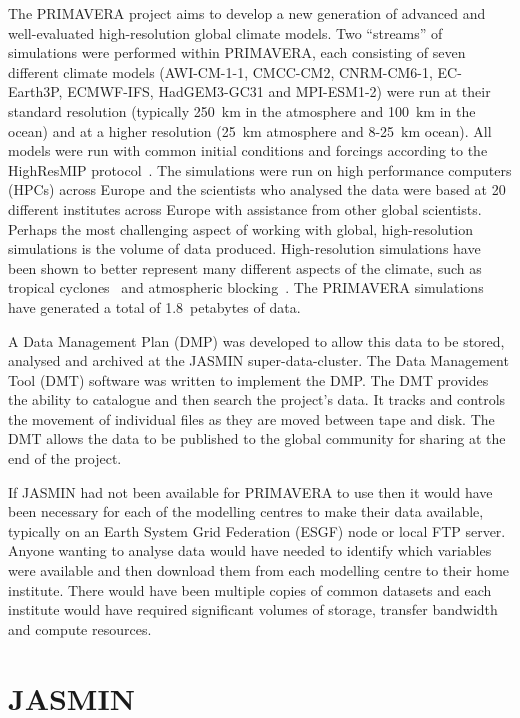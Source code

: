 \documentclass[gmd, manuscript]{copernicus}
\begin{document}


\introduction  %

The PRIMAVERA project aims to develop a new generation of advanced and well-evaluated high-resolution global climate models. Two ``streams'' of simulations were performed within PRIMAVERA, each consisting of seven different climate models (AWI-CM-1-1, CMCC-CM2, CNRM-CM6-1, EC-Earth3P, ECMWF-IFS, HadGEM3-GC31 and MPI-ESM1-2) were run at their standard resolution (typically  250~km in the atmosphere and 100~km in the ocean) and at a higher resolution (25~km atmosphere and 8-25~km ocean). All models were run with common initial conditions and forcings according to the HighResMIP protocol~\citep{Haarsma2016}. The simulations were run on high performance computers (HPCs) across Europe and the scientists who analysed the data were based at 20 different institutes across Europe with assistance from other global scientists. Perhaps the most challenging aspect of working with global, high-resolution simulations is the volume of data produced. High-resolution simulations have been shown to better represent many different aspects of the climate, such as tropical cyclones~\citep{Roberts2020} and atmospheric blocking~\citep{Schiemann2019}. The PRIMAVERA simulations have generated a total of 1.8~petabytes of data.

A Data Management Plan (DMP) was developed to allow this data to be stored, analysed and archived at the JASMIN super-data-cluster. The Data Management Tool (DMT) software was written to implement the DMP. The DMT provides the ability to catalogue and then search the project's data. It tracks and controls the movement of individual files as they are moved between tape and disk. The DMT allows the data to be published to the global community for sharing at the end of the project.

If JASMIN had not been available for PRIMAVERA to use then it would have been necessary for each of the modelling centres to make their data available, typically on an Earth System Grid Federation (ESGF) node or local FTP server. Anyone wanting to analyse data would have needed to identify which variables were available and then download them from each modelling centre to their home institute. There would have been multiple copies of common datasets and each institute would have required significant volumes of storage, transfer bandwidth and compute resources.

\section{JASMIN}
\end{document}
